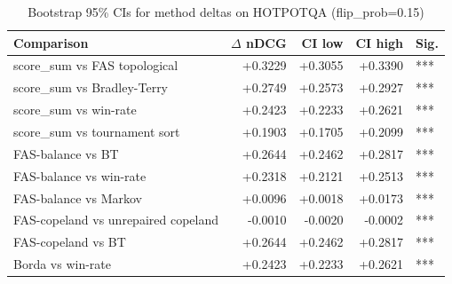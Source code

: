 \begin{table}[ht]
\centering
\caption{Bootstrap 95\% CIs for method deltas on HOTPOTQA (flip\_prob=0.15)}
\label{tab:bootstrap_hotpotqa}
\begin{tabular}{lrrrl}
\toprule
Comparison & $\Delta$ nDCG & CI low & CI high & Sig. \\
\midrule
score\_sum vs FAS topological & +0.3229 & +0.3055 & +0.3390 & *** \\
score\_sum vs Bradley-Terry & +0.2749 & +0.2573 & +0.2927 & *** \\
score\_sum vs win-rate & +0.2423 & +0.2233 & +0.2621 & *** \\
score\_sum vs tournament sort & +0.1903 & +0.1705 & +0.2099 & *** \\
FAS-balance vs BT & +0.2644 & +0.2462 & +0.2817 & *** \\
FAS-balance vs win-rate & +0.2318 & +0.2121 & +0.2513 & *** \\
FAS-balance vs Markov & +0.0096 & +0.0018 & +0.0173 & *** \\
FAS-copeland vs unrepaired copeland & -0.0010 & -0.0020 & -0.0002 & *** \\
FAS-copeland vs BT & +0.2644 & +0.2462 & +0.2817 & *** \\
Borda vs win-rate & +0.2423 & +0.2233 & +0.2621 & *** \\
\bottomrule
\end{tabular}
\end{table}